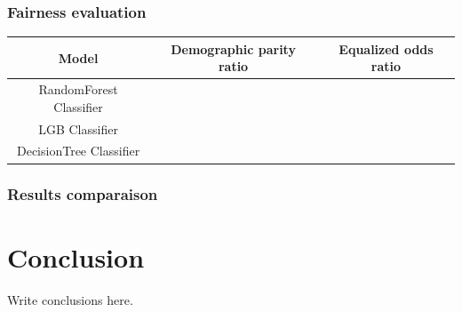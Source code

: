 \documentclass[12pt,a4paper,openright,twoside]{book}
\begin{document}
\subsection{Fairness evaluation}

\begin{tabular}{|c|c|c|}
    \hline
    \textbf{Model} & \textbf{Demographic parity ratio} & \textbf{Equalized odds ratio} \\
    \hline
    RandomForest Classifier & & \\
    \hline
    LGB Classifier & & \\
    \hline
    DecisionTree Classifier & & \\
    \hline
\end{tabular}

\subsection{Results comparaison}

\chapter{Conclusion}
\label{chap:conclusions}

Write conclusions here.



\backmatter




\end{document}
